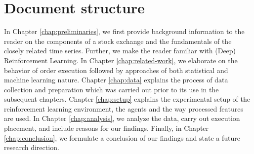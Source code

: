 \section{Document structure}

In Chapter \ref{chap:preliminaries}, we first provide background information to the reader on the components of a stock exchange and the fundamentals of the closely related time series.
Further, we make the reader familiar with (Deep) Reinforcement Learning.
In Chapter \ref{chap:related-work}, we elaborate on the behavior of order execution followed by approaches of both statistical and machine learning nature.
Chapter \ref{chap:data} explains the process of data collection and preparation which was carried out prior to its use in the subsequent chapters.
Chapter \ref{chap:setup} explains the experimental setup of the reinforcement learning environment, the agents and the way processed features are used.
In Chapter \ref{chap:analysis}, we analyze the data, carry out execution placement, and include reasons for our findings.
Finally, in Chapter \ref{chap:conclusion}, we formulate a conclusion of our findings and state a future research direction.
